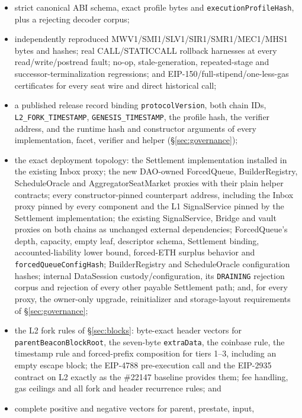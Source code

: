 \documentclass[a4paper,11pt]{article}
\newcommand{\code}[1]{\nolinkurl{#1}}
\begin{document}
\begin{itemize}
\item strict canonical ABI schema, exact profile bytes and
  \code{executionProfileHash}, plus a rejecting decoder corpus;
\item independently reproduced MWV1/SMI1/SLV1/SIR1/SMR1/MEC1/MHS1 bytes and
  hashes; real CALL/STATICCALL rollback harnesses at every read/write/postread
  fault; no-op, stale-generation, repeated-stage and successor-terminalization
  regressions; and EIP-150/full-stipend/one-less-gas certificates for every
  seat wire and direct historical call;
\item a published release record binding \code{protocolVersion}, both chain
  IDs, \code{L2_FORK_TIMESTAMP}, \code{GENESIS_TIMESTAMP}, the profile hash,
  the verifier address, and the runtime hash and constructor arguments of
  every implementation, facet, verifier and helper (\S\ref{sec:governance});
\item the exact deployment topology: the Settlement implementation installed
  in the existing Inbox proxy; the new DAO-owned ForcedQueue, BuilderRegistry,
  ScheduleOracle and AggregatorSeatMarket proxies with their plain helper
  contracts; every constructor-pinned counterpart address, including the Inbox
  proxy pinned by every component and the L1 SignalService pinned by the
  Settlement implementation; the existing SignalService, Bridge and vault
  proxies on both chains as unchanged external dependencies; ForcedQueue's
  depth, capacity, empty leaf, descriptor schema, Settlement binding,
  accounted-liability lower bound, forced-ETH surplus behavior and
  \code{forcedQueueConfigHash}; BuilderRegistry and ScheduleOracle
  configuration hashes; internal DataSession custody/configuration, its
  \code{DRAINING} rejection corpus and rejection of every other payable
  Settlement path; and, for every proxy, the owner-only upgrade,
  reinitializer and storage-layout requirements of \S\ref{sec:governance};
\item the L2 fork rules of \S\ref{sec:blocks}: byte-exact header vectors for
  \code{parentBeaconBlockRoot}, the seven-byte \code{extraData}, the coinbase
  rule, the timestamp rule and forced-prefix composition for tiers 1--3,
  including an empty escape block; the EIP-4788 pre-execution call and the
  EIP-2935 contract on L2 exactly as the \#22147 baseline provides them; fee
  handling, gas ceilings and all fork and header recurrence rules; and
\item complete positive and negative vectors for parent, prestate, input,

\end{itemize}
\end{document}
